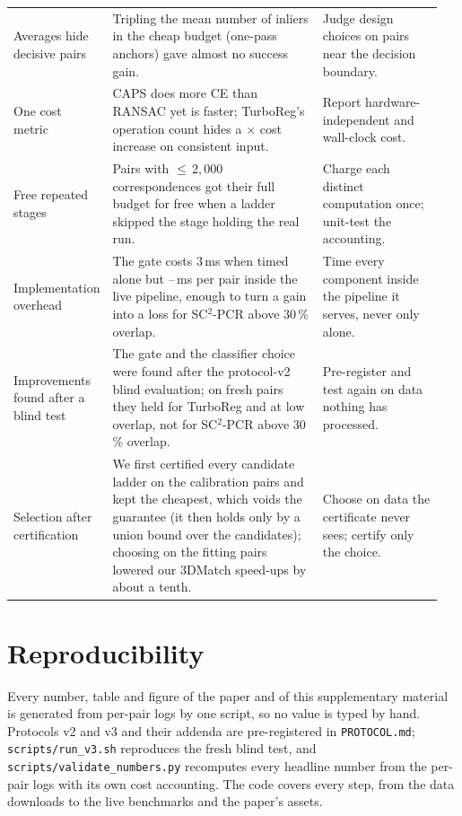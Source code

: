\documentclass[10pt,twocolumn,letterpaper]{article}
\makeatletter
\newcommand{\X}{$\times$\xspace}
\newcommand{\SCP}{SC$^2$-PCR\xspace}
\newcommand{\thissupp}{this supplementary material}
\newcommand{\val}[1]{\@ifundefined{val@#1}{\textbf{\textcolor{red}{??\detokenize{#1}}}}{\@nameuse{val@#1}}}
\makeatother
\begin{document}
\begin{table}[t]
\begin{tabular}{@{}p{0.18\linewidth}p{0.49\linewidth}p{0.28\linewidth}@{}}
Averages hide decisive pairs & Tripling the mean number of inliers in the cheap budget (one-pass anchors) gave almost no success gain. & Judge design choices on pairs near the decision boundary.\\
One cost metric & CAPS does more CE than RANSAC yet is faster; TurboReg's operation count hides a \val{abl.stage0.turbo.factor}\X cost increase on consistent input. & Report hardware-independent and wall-clock cost.\\
Free repeated stages & Pairs with ${\le}\,2{,}000$ correspondences got their full budget for free when a ladder skipped the stage holding the real run. & Charge each distinct computation once; unit-test the accounting.\\
Implementation overhead & The gate costs 3\,ms when timed alone but \val{v3.gate.live.overhead.min}--\val{v3.gate.live.overhead.max}\,ms per pair inside the live pipeline, enough to turn a gain into a loss for \SCP above 30\,\% overlap. & Time every component inside the pipeline it serves, never only alone.\\
Improvements found after a blind test & The gate and the classifier choice were found after the protocol-v2 blind evaluation; on fresh pairs they held for TurboReg and at low overlap, not for \SCP above 30\,\% overlap. & Pre-register and test again on data nothing has processed.\\
Selection after certification & We first certified every candidate ladder on the calibration pairs and kept the cheapest, which voids the guarantee (it then holds only by a union bound over the candidates); choosing on the fitting pairs lowered our 3DMatch speed-ups by about a tenth. & Choose on data the certificate never sees; certify only the choice.\\
\bottomrule
\end{tabular}
\end{table}

\section{Reproducibility}
\label{supp:repro}
 Every number, table and figure of the paper and of \thissupp{} is generated from per-pair logs by one script, so no value is typed by hand.
Protocols v2 and v3 and their addenda are pre-registered in \texttt{PROTOCOL.md}; \texttt{scripts/run\_v3.sh} reproduces the fresh blind test, and \texttt{scripts/validate\_numbers.py} recomputes every headline number from the per-pair logs with its own cost accounting. The code covers every step, from the data downloads to the live benchmarks and the paper's assets.

\clearpage  %
{\small

}
\end{document}
